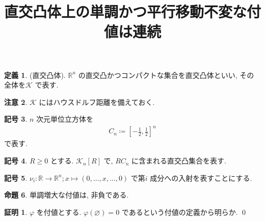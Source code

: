 \documentclass[10pt, fleqn, label-section=none]{bxjsarticle}
\title{直交凸体上の単調かつ平行移動不変な付値は連続}
\date{}
\author{}
\theoremstyle{definition}
\newtheorem{dfn}{定義}[section]
\newtheorem{prop}[dfn]{命題}
\newtheorem{notation}[dfn]{記号}
\newtheorem*{pf*}{証明}
\newtheorem{remark}[dfn]{注意}
\renewcommand{\;}{\, ; \,}
\begin{document}
\maketitle

\section{}

\begin{dfn}(直交凸体). $\mathbb R^n$ の直交凸かつコンパクトな集合を直交凸体といい, その全体を$\mathcal K$ で表す. 

\end{dfn}

\begin{remark}$\mathcal K$ にはハウスドルフ距離を備えておく. 

\end{remark}


\begin{notation}$n$ 次元単位立方体を
\begin{align*} C_n \coloneqq [-\frac{1}{2}, \frac{1}{2}]^n  \end{align*}
で表す. 
\end{notation}

\begin{notation}$R \geq 0$ とする. $\mathcal K_n [R]$ で, $RC_n$ に含まれる直交凸集合を表す. 

\end{notation}

\begin{notation}$\nu_i: \mathbb R \rightarrow \mathbb R^n; x \mapsto (0, \ldots, x, \ldots, 0 )$ で第$i$ 成分への入射を表すことにする. 
\end{notation}



\begin{prop}単調増大な付値は, 非負である. 
\end{prop}
\begin{pf*}$\varphi$ を付値とする. 
$\varphi (\varnothing) = 0$ であるという付値の定義から明らか. 
\qed
\end{pf*}
\end{document}
